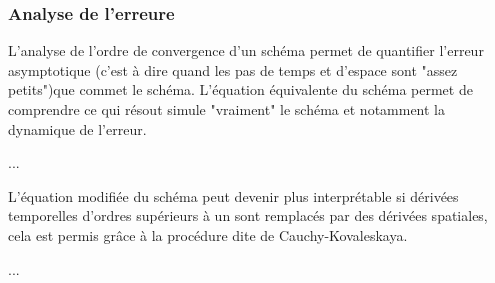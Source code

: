     \subsubsection{Analyse de l'erreure}
        L'analyse de l'ordre de convergence d'un schéma permet de quantifier l'erreur asymptotique 
        (c'est à dire quand les pas de temps et d'espace sont "assez petits")que commet le schéma.
        L'équation équivalente du schéma permet de comprendre ce qui résout simule "vraiment" le schéma et notamment la dynamique de l'erreur.
        \begin{definition}
            ...
        \end{definition}
        L'équation modifiée du schéma peut devenir plus interprétable si dérivées temporelles d'ordres supérieurs à un sont remplacés par 
        des dérivées spatiales, cela est permis grâce à la procédure dite de Cauchy-Kovaleskaya.
        \begin{definition}
            ...
        \end{definition}
    